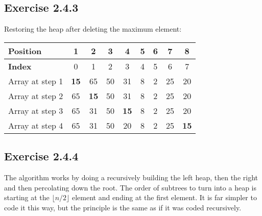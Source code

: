 \documentclass{article}
\begin{document}
\subsection*{Exercise 2.4.3}

Restoring the heap after deleting the maximum element:

\begin{tabular}{|l|c|c|c|c|c|c|c|c|}
\hline
\textbf{Position}& 1& 2& 3& 4& 5& 6& 7& 8 \\
\hline
\textbf{Index}& 0& 1& 2& 3& 4& 5& 6& 7 \\
\hline
Array at step 1& \textbf{15}& 65& 50& 31& 8& 2& 25& 20 \\
\hline
Array at step 2& 65& \textbf{15}& 50& 31& 8& 2& 25& 20 \\
\hline
Array at step 3& 65& 31& 50& \textbf{15}& 8& 2& 25& 20 \\
\hline
Array at step 4& 65& 31& 50& 20& 8& 2& 25& \textbf{15} \\
\hline
\end{tabular}


\subsection*{Exercise 2.4.4}

The algorithm works by doing a recursively building the left heap, then the right and then percolating down the root. The order of subtrees to turn into a heap is starting at the \(\lfloor n/2 \rfloor\) element and ending at the first element. It is far simpler to code it this way, but the principle is the same as if it was coded recursively. 
\end{document}
